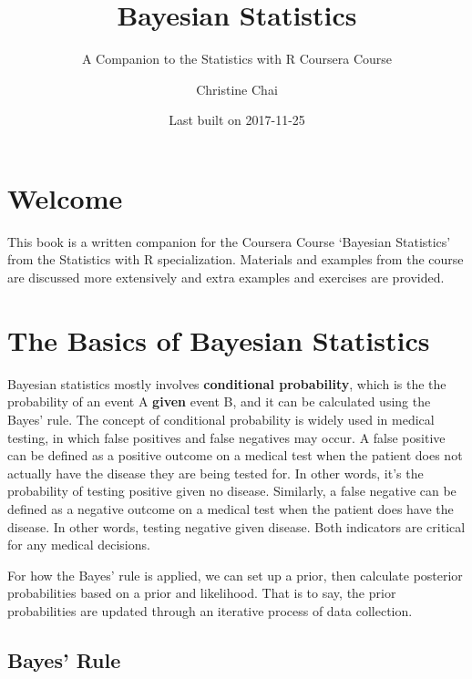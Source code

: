 \documentclass[]{book}
\title{Bayesian Statistics}
\subtitle{A Companion to the Statistics with R Coursera Course}
\author{Christine Chai}
\date{Last built on 2017-11-25}
\theoremstyle{definition}
\theoremstyle{definition}
\theoremstyle{definition}
\theoremstyle{remark}
\begin{document}
\maketitle

{
\setcounter{tocdepth}{1}
\tableofcontents
}
\chapter*{Welcome}\label{welcome}

\newcommand{\No}{\textsf{N}}
\newcommand{\Ga}{\textsf{Gamma}}
\newcommand{\St}{\textsf{t}}
\newcommand{\NoGa}{\textsf{NormalGamma}}
\newcommand{\BF}{\textsf{BF}}
\newcommand{\data}{\text{data}}
\newcommand{\iid}{\mathrel{\mathop{\sim}\limits^{\rm iid}}}
\newcommand{\Ca}{\textsf{C}}



This book is a written companion for the Coursera Course `Bayesian
Statistics' from the Statistics with R specialization. Materials and
examples from the course are discussed more extensively and extra
examples and exercises are provided.

\chapter{The Basics of Bayesian
Statistics}\label{the-basics-of-bayesian-statistics}

Bayesian statistics mostly involves \textbf{conditional probability},
which is the the probability of an event A \textbf{given} event B, and
it can be calculated using the Bayes' rule. The concept of conditional
probability is widely used in medical testing, in which false positives
and false negatives may occur. A false positive can be defined as a
positive outcome on a medical test when the patient does not actually
have the disease they are being tested for. In other words, it's the
probability of testing positive given no disease. Similarly, a false
negative can be defined as a negative outcome on a medical test when the
patient does have the disease. In other words, testing negative given
disease. Both indicators are critical for any medical decisions.

For how the Bayes' rule is applied, we can set up a prior, then
calculate posterior probabilities based on a prior and likelihood. That
is to say, the prior probabilities are updated through an iterative
process of data collection.

\section{Bayes' Rule}\label{bayes-rule}
\end{document}
